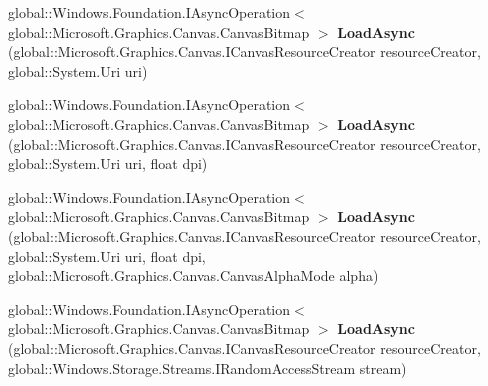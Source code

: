 \begin{DoxyCompactItemize}
\item 
\mbox{\label{interface_microsoft_1_1_graphics_1_1_canvas_1_1_i_canvas_bitmap_statics_aff3790fad580cc555b6012c8dbdb714a}} 
global\+::\+Windows.\+Foundation.\+I\+Async\+Operation$<$ global\+::\+Microsoft.\+Graphics.\+Canvas.\+Canvas\+Bitmap $>$ {\bfseries Load\+Async} (global\+::\+Microsoft.\+Graphics.\+Canvas.\+I\+Canvas\+Resource\+Creator resource\+Creator, global\+::\+System.\+Uri uri)
\item 
\mbox{\label{interface_microsoft_1_1_graphics_1_1_canvas_1_1_i_canvas_bitmap_statics_af4c626979802daccd30d910bec8173dd}} 
global\+::\+Windows.\+Foundation.\+I\+Async\+Operation$<$ global\+::\+Microsoft.\+Graphics.\+Canvas.\+Canvas\+Bitmap $>$ {\bfseries Load\+Async} (global\+::\+Microsoft.\+Graphics.\+Canvas.\+I\+Canvas\+Resource\+Creator resource\+Creator, global\+::\+System.\+Uri uri, float dpi)
\item 
\mbox{\label{interface_microsoft_1_1_graphics_1_1_canvas_1_1_i_canvas_bitmap_statics_a94497c091c07b642b641c18ab26c5933}} 
global\+::\+Windows.\+Foundation.\+I\+Async\+Operation$<$ global\+::\+Microsoft.\+Graphics.\+Canvas.\+Canvas\+Bitmap $>$ {\bfseries Load\+Async} (global\+::\+Microsoft.\+Graphics.\+Canvas.\+I\+Canvas\+Resource\+Creator resource\+Creator, global\+::\+System.\+Uri uri, float dpi, global\+::\+Microsoft.\+Graphics.\+Canvas.\+Canvas\+Alpha\+Mode alpha)
\item 
\mbox{\label{interface_microsoft_1_1_graphics_1_1_canvas_1_1_i_canvas_bitmap_statics_aeaa6f47b7f2c1650f21a1d3a0e4b26b9}} 
global\+::\+Windows.\+Foundation.\+I\+Async\+Operation$<$ global\+::\+Microsoft.\+Graphics.\+Canvas.\+Canvas\+Bitmap $>$ {\bfseries Load\+Async} (global\+::\+Microsoft.\+Graphics.\+Canvas.\+I\+Canvas\+Resource\+Creator resource\+Creator, global\+::\+Windows.\+Storage.\+Streams.\+I\+Random\+Access\+Stream stream)
\item 
\mbox{\label{interface_microsoft_1_1_graphics_1_1_canvas_1_1_i_canvas_bitmap_statics_a599beec33068d90d8aaa8e93719f8394}} 

\end{DoxyCompactItemize}
